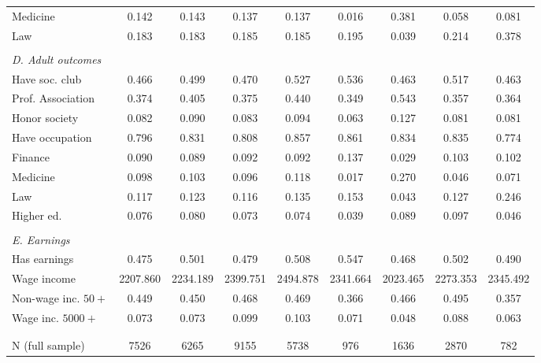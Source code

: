 \begin{tabular}{l*{8}{c}}
Medicine& 0.142& 0.143& 0.137& 0.137& 0.016& 0.381& 0.058& 0.081\\
Law& 0.183& 0.183& 0.185& 0.185& 0.195& 0.039& 0.214& 0.378\\
\\[-1.0em]
\emph{D. Adult outcomes}\\
Have soc. club& 0.466& 0.499& 0.470& 0.527& 0.536& 0.463& 0.517& 0.463\\
Prof. Association& 0.374& 0.405& 0.375& 0.440& 0.349& 0.543& 0.357& 0.364\\
Honor society& 0.082& 0.090& 0.083& 0.094& 0.063& 0.127& 0.081& 0.081\\
Have occupation& 0.796& 0.831& 0.808& 0.857& 0.861& 0.834& 0.835& 0.774\\
Finance& 0.090& 0.089& 0.092& 0.092& 0.137& 0.029& 0.103& 0.102\\
Medicine& 0.098& 0.103& 0.096& 0.118& 0.017& 0.270& 0.046& 0.071\\
Law& 0.117& 0.123& 0.116& 0.135& 0.153& 0.043& 0.127& 0.246\\
Higher ed.& 0.076& 0.080& 0.073& 0.074& 0.039& 0.089& 0.097& 0.046\\
\\[-1.0em]
\emph{E. Earnings}\\
Has earnings& 0.475& 0.501& 0.479& 0.508& 0.547& 0.468& 0.502& 0.490\\
Wage income& 2207.860& 2234.189& 2399.751& 2494.878& 2341.664& 2023.465& 2273.353& 2345.492\\
Non-wage inc. $50+$& 0.449& 0.450& 0.468& 0.469& 0.366& 0.466& 0.495& 0.357\\
Wage inc. $5000+$& 0.073& 0.073& 0.099& 0.103& 0.071& 0.048& 0.088& 0.063\\
\\[-1.0em]
\\
N (full sample)	&     7526	&     6265	&     9155	&     5738	&      976	&     1636	&     2870	&      782\\
\bottomrule
\end{tabular}
